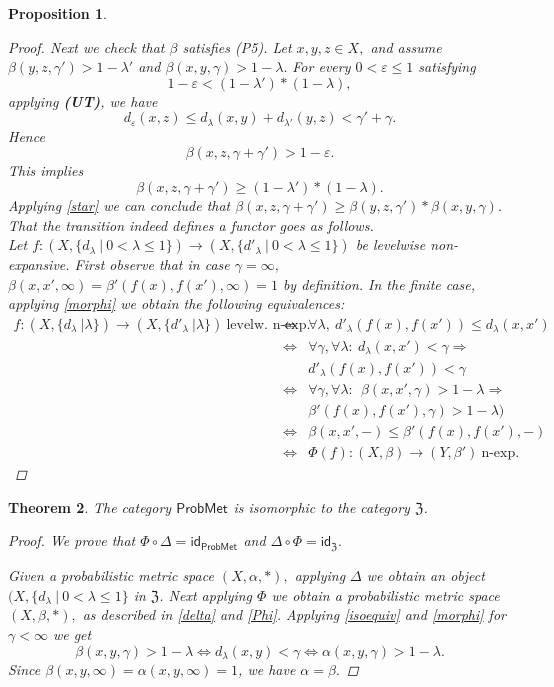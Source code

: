 \documentclass[12pt,a4paper]{amsart}
\theoremstyle{theorem}
\newtheorem{theorem}{Theorem}[section]
\newtheorem{proposition}[theorem]{Proposition}
\theoremstyle{definition}
\newcommand{\zz}{\ensuremath{\mathfrak{Z}}}
\newcommand{\PM}{\ensuremath{\mathsf{ProbMet_{}}}}
\renewcommand{\a}{\ensuremath{\alpha}}
\renewcommand{\b}{\ensuremath{\beta}}
\newcommand{\ve}{\ensuremath{\varepsilon}}
\renewcommand{\l}{\ensuremath{\lambda}}
\def\rw{\rightarrow}
\begin{document}
{\begin{proposition}
\begin{proof}
Next we check that $\b$ satisfies (P5). Let $x,y,z \in X,$ and assume $\b(y,z,\gamma') > 1 - \l'$ and $\b(x,y,\gamma) > 1 - \l.$  
For every $ 0 < \ve \leq 1 $ satisfying 
$$
1-\ve  < (1 - \l') * ( 1 - \l),
$$
applying {\bf(UT)},  
we have
$$
d_\ve(x,z) \leq d_\l(x,y) + d_{\l'}(y,z) < \gamma' + \gamma.
$$
Hence
$$
\b(x,z, \gamma + \gamma') > 1 - \ve. 
$$
This implies
$$
\b(x,z, \gamma + \gamma') \geq  (1 - \l') * ( 1 - \l).
$$
Applying \ref{star}
we can conclude that $\b(x,z, \gamma + \gamma') \geq \b(y,z, \gamma')  * \b(x,y, \gamma). $\\



That the transition indeed defines a functor goes as follows.\\
Let $f: (X, \{ d_\l \ | \ 0 < \l \leq 1 \}) \rw (X, \{ d'_\l \ | \ 0 < \l \leq 1 \})$ be levelwise non-expansive.
First observe that in case $\gamma = \infty,$  $\b(x,x',\infty) =  \b'(f(x), f(x'), \infty )= 1$ by definition.
 In the finite case, applying \eqref{morphi} we obtain the following equivalences:
  \begin{eqnarray*}\label{phifunctor}
  f:  (X, \{ d_\l \ | \l \}) \rw (X, \{ d'_\l \ | \l \}) \  \text{levelw. n-exp}.&\Leftrightarrow & \forall \l, \  d'_\l(f(x), f(x')) \leq d_\l (x,x')\\
&\Leftrightarrow& \forall \gamma,  \forall \l : \  d_\l(x,x') < \gamma \Rightarrow\\
&&  d'_\l(f(x), f(x')) < \gamma\\
&\Leftrightarrow& \forall \gamma, \forall \l : \ \ \b(x,x', \gamma) > 1 - \l  \Rightarrow\\
&& \b'(f(x), f(x') , \gamma) > 1 - \l )\\
&\Leftrightarrow&\b(x,x', -) \leq \b'(f(x), f(x') , -)\\
&\Leftrightarrow&\Phi(f) : (X, \b ) \rw (Y, \b' )\  \text{n-exp.} 
\end{eqnarray*}
\end{proof}
\end{proposition}


\begin{theorem}
The category $\PM$ is isomorphic to the category $\mathfrak{Z}$.
\begin{proof}
We prove that $ \Phi \circ \Delta =\mathsf{id}_{\PM} $ and $ \Delta \circ \Phi = \mathsf{id}_{\zz}.$

Given a probabilistic metric space $(X, \a, *),$ applying $\Delta$ we obtain an object  $(X, \{d_\l \ | \ 0 <\l \leq 1 \}$ in $\zz$. Next applying $\Phi$ we obtain a probabilistic metric space $(X, \b, *),$ as described in \ref{delta} and \ref{Phi}. Applying \eqref{isoequiv} and \eqref{morphi}  for $\gamma < \infty$ we get 
$$
\b(x,y,\gamma) > 1 - \l  \Leftrightarrow d_\l (x,y) < \gamma \Leftrightarrow \a(x,y,\gamma) > 1-\l.
$$
Since $\b(x,y,\infty) = \a(x,y,\infty)= 1$, we have $\a = \b.$ 


\end{proof}
\end{theorem}}
\end{document}
